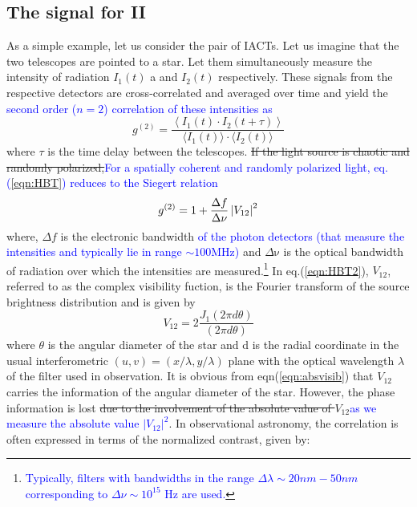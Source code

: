 \subsection{The signal for II}\label{sec:signal}
As a simple example, let us consider the pair of IACTs. Let us imagine that the two telescopes are pointed to a star. Let them simultaneously measure the intensity of radiation $I_1(t)$ a  and $I_2(t)$ respectively. These signals from the respective detectors are cross-correlated and averaged over time and yield the \textcolor{blue}{second order ($n=2$) correlation of these intensities as}  \citep{acciari2020optical, dravins2013optical}
\begin{equation}
	g^{(2)}= \frac{\left\langle I_1(t) \cdot I_2(t + \tau) \right\rangle}{\langle I_1(t) \rangle \cdot \langle I_2(t) \rangle} 
	\label{eqn:HBT}
\end{equation}
where $\tau$ is the time delay between the telescopes. \st{If the light source is chaotic and randomly polarized,}\textcolor{blue}{For a spatially coherent and randomly polarized light, eq.(\ref{eqn:HBT}) reduces to the Siegert relation \citep{acciari2020optical}}
\begin{equation}
	g^{(2)} = 1 + \frac{\Delta f}{\Delta \nu} \left|V_{12}\right|^2
	\label{eqn:HBT2}
\end{equation}
where, $\Delta f$ is the electronic bandwidth \textcolor{blue}{of the photon detectors (that measure the intensities and typically lie in range $\sim 100 {\mathrm {MHz}}$)} and $\Delta {\mathrm {\nu}}$ is the optical bandwidth of radiation over which the intensities are measured.\footnote{\textcolor{blue}{Typically, filters with bandwidths in the range $\Delta \lambda \sim 20 nm - 50 nm$ corresponding to $\Delta \nu \sim 10^{15}$ Hz are used.}} In eq.(\ref{eqn:HBT2}), $V_{12}$, referred to as the complex visibility fuction, is the Fourier transform of the source brightness distribution and is given by
\begin{equation}
 V_{12} = 2 \frac{J_1(2 \pi d \theta)}{(2 \pi d \theta)}
\label{eqn:absvisib}
\end{equation}
where $\theta$ is the angular diameter of the star and d is the radial coordinate in the usual interferometric $(u , v) = (x/\lambda, y/\lambda)$ plane with the optical wavelength $\lambda$ of the filter used in observation. It is obvious from eqn(\ref{eqn:absvisib}) that $V_{12}$ carries the information of the angular diameter of the star. However, the phase information is lost \st{due to the involvement of the absolute value of $V_{12}$}\textcolor{blue}{as we measure the absolute value $\vert V_{12} \vert^2$}. In observational astronomy, the correlation is often expressed in terms of the normalized contrast, given by:
